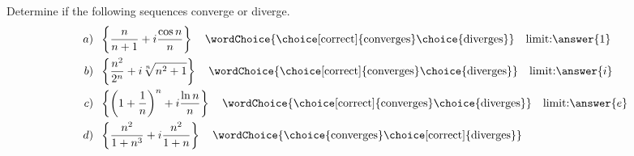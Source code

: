 \documentclass[handout]{ximera}
\begin{document}
\begin{problem}
Determine if the following sequences converge or diverge.
\begin{align*}
a) \;\; &\left\{\frac{n}{n+1}+ i\frac{\cos n}{n} \right\} \quad \mbox{\wordChoice{\choice[correct]{converges}\choice{diverges}}} \quad \text{limit:} \answer{1}\\
b) \;\; & \left\{\frac{n^2}{2^n}+ i\sqrt[n]{n^2 +1} \right\} \quad \mbox{\wordChoice{\choice[correct]{converges}\choice{diverges}}} \quad \text{limit:} \answer{i}\\
c) \;\; & \left\{\left(1+\frac{1}{n}\right)^n+ i\frac{\ln n}{n} \right\} \quad \mbox{\wordChoice{\choice[correct]{converges}\choice{diverges}}} \quad \text{limit:} \answer{e}\\
d) \;\; & \left\{\frac{n^2}{1+n^3}+i\frac{n^2}{1+n} \right\} \quad \mbox{\wordChoice{\choice{converges}\choice[correct]{diverges}}} 
\end{align*}
\end{problem}
\end{document}
